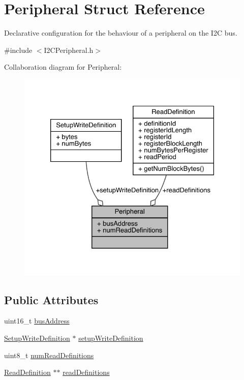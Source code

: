 \hypertarget{struct_peripheral}{}\section{Peripheral Struct Reference}
\label{struct_peripheral}


Declarative configuration for the behaviour of a peripheral on the I2C bus.  




{\ttfamily \#include $<$I2\+C\+Peripheral.\+h$>$}



Collaboration diagram for Peripheral\+:\nopagebreak
\begin{figure}[H]
\begin{center}
\leavevmode
\includegraphics[width=326pt]{struct_peripheral__coll__graph}
\end{center}
\end{figure}
\subsection*{Public Attributes}
\begin{DoxyCompactItemize}
\item 
uint16\+\_\+t \mbox{\hyperlink{struct_peripheral_aeb9b037f7be4b84e967382c046077046}{bus\+Address}}
\item 
\mbox{\hyperlink{struct_setup_write_definition}{Setup\+Write\+Definition}} $\ast$ \mbox{\hyperlink{struct_peripheral_ab2a550bc5d7e03dcba843bf6f6367e12}{setup\+Write\+Definition}}
\item 
uint8\+\_\+t \mbox{\hyperlink{struct_peripheral_ae8a8523c12a7df87f2a0ebbce23658fe}{num\+Read\+Definitions}}
\item 
\mbox{\hyperlink{struct_read_definition}{Read\+Definition}} $\ast$$\ast$ \mbox{\hyperlink{struct_peripheral_a140bc115ee96fd0ab21ab1127beac7af}{read\+Definitions}}
\end{DoxyCompactItemize}


